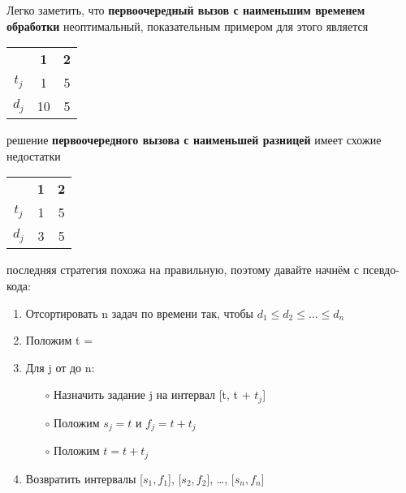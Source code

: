 \vspace{\baselineskip}
Легко заметить, что \textbf{первоочередный вызов с наименьшим временем обработки} неоптимальный, показательным примером для этого является

\vspace{\baselineskip}
\begin{tabular}{ccc}
\multicolumn{1}{c}{\textbf{}} &
\multicolumn{1}{c}{\textbf{1}} & \multicolumn{1}{c}{\textbf{2}} \\[5pt]
\ttfamily $t_j$ & 1 & 5\\[5pt]
\ttfamily $d_j$ & 10 & 5 \\[5pt]
\end{tabular}

\vspace{\baselineskip}
решение \textbf{первоочередного вызова с наименьшей разницей} имеет схожие недостатки

\vspace{\baselineskip}
\begin{tabular}{ccc}
\multicolumn{1}{c}{\textbf{}} &
\multicolumn{1}{c}{\textbf{1}} & \multicolumn{1}{c}{\textbf{2}} \\[5pt]
\ttfamily $t_j$ & 1 & 5\\[5pt]
\ttfamily $d_j$ & 3 & 5 \\[5pt]
\end{tabular}

\vspace{\baselineskip}
последняя стратегия похожа на правильную, поэтому давайте начнём с псевдо-кода:

\vspace{\baselineskip}
\begin{enumerate}
    \item Отсортировать n задач по времени так, чтобы $d_1 \le d_2 \le \ldots \le d_n$
    \item Положим t = {\color{Purple}{0}}
    \item Для j от {\color{Purple}{1}} до n:
    \begin{enumerate}
        \item[$\circ$] Назначить задание j на интервал [t, t + $t_j$]
        \item[$\circ$] Положим $s_j = t$ и $f_j = t + t_j$
        \item[$\circ$] Положим $t = t + t_j$
    \end{enumerate}
    \item Возвратить интервалы [$s_1, f_1$], [$s_2, f_2$], \ldots, [$s_n, f_n$]
\end{enumerate}

